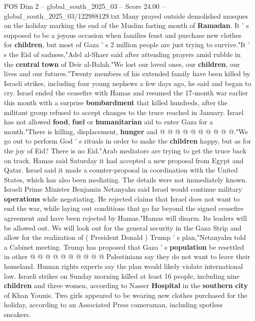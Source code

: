 \begin{textsample}{POS Dim 2 – global\_south\_2025\_03 – Score 24.00 – global\_south\_2025\_03/122988129.txt}  \label{ex:f2_pos_305}
Many prayed outside demolished mosques on the holiday marking the end of the Muslim fasting month of \textbf{Ramadan}.
It ' s supposed to be a joyous occasion when families feast and purchase new clothes for \textbf{children}, but most of Gaza ' s 2 million people are just trying to survive."It ' s the Eid of sadness,"Adel al-Shaer said after attending prayers amid rubble in the \textbf{central} \textbf{town} of Deir al-Balah."We lost our loved ones, our \textbf{children}, our lives and our futures."Twenty members of his extended family have been killed by Israeli strikes, including four young nephews a few days ago, he said and began to cry.
Israel ended the ceasefire with Hamas and resumed the 17-month war earlier this month with a surprise \textbf{bombardment} that killed hundreds, after the militant group refused to accept changes to the truce reached in January.
Israel has not allowed \textbf{food}, \textbf{fuel} or \textbf{humanitarian} aid to enter Gaza for a month."There is killing, displacement, \textbf{hunger} and @ @ @ @ @ @ @ @ @ @."We go out to perform God ' s rituals in order to make the \textbf{children} happy, but as for the joy of Eid?
There is no Eid."Arab mediators are trying to get the truce back on track.
Hamas said Saturday it had accepted a new proposal from Egypt and Qatar.
Israel said it made a counter-proposal in coordination with the United States, which has also been mediating.
The details were not immediately known.
Israeli Prime Minister Benjamin Netanyahu said Israel would continue military \textbf{operations} while negotiating.
He rejected claims that Israel does not want to end the war, while laying out conditions that go far beyond the signed ceasefire agreement and have been rejected by Hamas."Hamas will disarm.
Its leaders will be allowed out.
We will look out for the general security in the Gaza Strip and allow for the realization of ( President Donald ) Trump ' s plan,"Netanyahu told a Cabinet meeting.
Trump has proposed that Gaza ' s \textbf{population} be resettled in other @ @ @ @ @ @ @ @ @ @ Palestinians say they do not want to leave their homeland.
Human rights experts say the plan would likely violate international law.
Israeli strikes on Sunday morning killed at least 16 people, including nine \textbf{children} and three women, according to Nasser \textbf{Hospital} in the \textbf{southern} \textbf{city} of Khan Younis.
Two girls appeared to be wearing new clothes purchased for the holiday, according to an Associated Press cameraman, including spotless sneakers.

\end{textsample}
